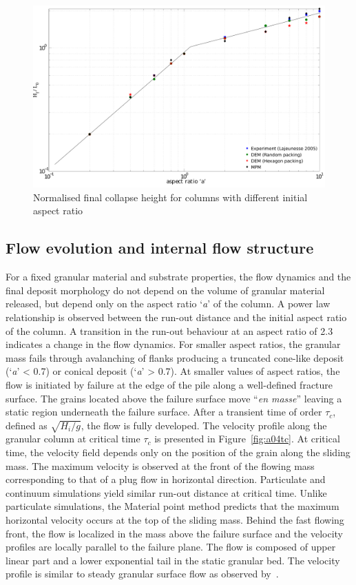 \begin{figure}[tbhp]
\centering
\includegraphics[width=\textwidth]{height}
\caption{Normalised final collapse height for columns with different initial 
aspect ratio}
\label{fig:height}
\end{figure}

\subsection{Flow evolution and internal flow structure}
For a fixed granular material and substrate properties, the flow dynamics and 
the final deposit morphology do not depend on the volume of granular material 
released, but depend only on the aspect ratio `\textit{a}' of the column. A 
power law relationship is observed between the run-out distance and the initial 
aspect ratio of the column. A transition in the run-out behaviour at an aspect 
ratio of 2.3 indicates a change in the flow dynamics. For smaller aspect 
ratios, the granular mass fails through avalanching of flanks producing a 
truncated cone-like deposit (`\textit{a}' < 0.7) or conical deposit 
(`\textit{a}' > 0.7). At smaller values of aspect ratios, the flow is initiated 
by failure at the edge of the pile along a well-defined fracture surface. The 
grains located above the failure surface move ``\textit{en masse}'' leaving a 
static region underneath the failure surface. After a transient time of order 
$\tau_{c}$, defined as $\sqrt{H_{\textit{i}}/g}$, the flow is fully developed. 
The velocity profile along the granular column at critical time $\tau_{c}$ is 
presented in Figure~\ref{fig:a04tc}. At critical time, the velocity field 
depends only on the position of the grain along the sliding mass. The maximum 
velocity is observed at the front of the flowing mass corresponding to that of 
a plug flow in horizontal direction. Particulate and continuum simulations 
yield similar run-out distance at critical time. Unlike particulate 
simulations, the Material point method predicts that the maximum horizontal 
velocity occurs at the top of the sliding mass. Behind the fast flowing front, 
the flow is localized in the mass above the failure surface and the velocity 
profiles are locally parallel to the failure plane. The flow is composed of 
upper linear part and a lower exponential tail in the static granular bed. The 
velocity profile is similar to steady granular surface flow as observed 
by~\citet{Lajeunesse2004}. 

